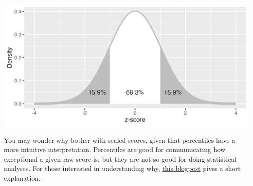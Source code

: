 \begin{tcolorbox}[enhanced, breakable,colback=Black!5!Lightgray,colframe=black!75!black,coltitle=white,title=How scaled scores are derived]
\includegraphics[width=0.75\linewidth]{images_bw/zDensityCDF} \label{zDensityCDF}

You may wonder why bother with scaled scores, given that percentiles have a more intuitive interpretation. Percentiles are good for communicating how exceptional a given raw score is, but they are not so good for doing statistical analyses. For those interested in understanding why, \href{http://deevybee.blogspot.com/2011/04/short-nerdy-post-about-use-of.html}{this blogpost} gives a short explanation.
\end{tcolorbox}